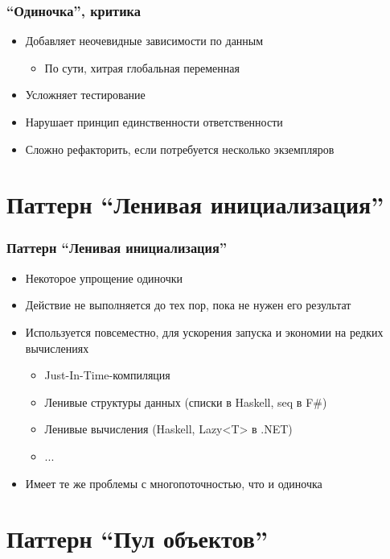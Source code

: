 \documentclass{../../slides-style}
\begin{document}
    \begin{frame}
        \frametitle{``Одиночка'', критика}
        \begin{itemize}
            \item Добавляет неочевидные зависимости по данным
            \begin{itemize}
                \item По сути, хитрая глобальная переменная
            \end{itemize}
            \item Усложняет тестирование
            \item Нарушает принцип единственности ответственности
            \item Сложно рефакторить, если потребуется несколько экземпляров
        \end{itemize}
    \end{frame}

    \section{Паттерн ``Ленивая инициализация''}

    \begin{frame}
        \frametitle{Паттерн ``Ленивая инициализация''}
        \begin{itemize}
            \item Некоторое упрощение одиночки
            \item Действие не выполняется до тех пор, пока не нужен его результат
            \item Используется повсеместно, для ускорения запуска и экономии на редких вычислениях
            \begin{itemize}
                \item Just-In-Time-компиляция
                \item Ленивые структуры данных (списки в Haskell, seq в F\#)
                \item Ленивые вычисления (Haskell, Lazy<T> в .NET)
                \item ...
            \end{itemize}
            \item Имеет те же проблемы с многопоточностью, что и одиночка
        \end{itemize}
    \end{frame}

    \section{Паттерн ``Пул объектов''}
\end{document}
